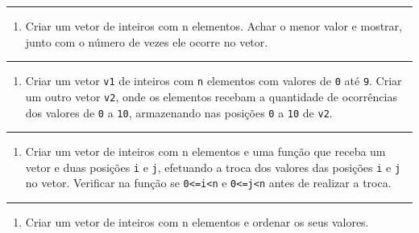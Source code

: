 \documentclass[12pt,a4paper]{article}
\renewcommand{\linethickness}{0.05em}
\providecommand{\tightlist}{%
      \setlength{\itemsep}{0pt}\setlength{\parskip}{0pt}}
\begin{document}
    \begin{center}\rule{0.5\linewidth}{\linethickness}\end{center}

\begin{enumerate}
\def\labelenumi{\arabic{enumi}.}
\setcounter{enumi}{1}
\tightlist
\item
  Criar um vetor de inteiros com n elementos. Achar o menor valor e
  mostrar, junto com o número de vezes ele ocorre no vetor.
\end{enumerate}

    \begin{center}\rule{0.5\linewidth}{\linethickness}\end{center}

\begin{enumerate}
\def\labelenumi{\arabic{enumi}.}
\setcounter{enumi}{2}
\tightlist
\item
  Criar um vetor \texttt{v1} de inteiros com \texttt{n} elementos com
  valores de \texttt{0} até \texttt{9}. Criar um outro vetor
  \texttt{v2}, onde os elementos recebam a quantidade de ocorrências dos
  valores de \texttt{0} a \texttt{10}, armazenando nas posições
  \texttt{0} a \texttt{10} de \texttt{v2}.
\end{enumerate}

    \begin{center}\rule{0.5\linewidth}{\linethickness}\end{center}

\begin{enumerate}
\def\labelenumi{\arabic{enumi}.}
\setcounter{enumi}{3}
\tightlist
\item
  Criar um vetor de inteiros com n elementos e uma função que receba um
  vetor e duas posições \texttt{i} e \texttt{j}, efetuando a troca dos
  valores das posições \texttt{i} e \texttt{j} no vetor. Verificar na
  função se \texttt{0\textless{}=i\textless{}n} e
  \texttt{0\textless{}=j\textless{}n} antes de realizar a troca.
\end{enumerate}

    \begin{center}\rule{0.5\linewidth}{\linethickness}\end{center}

\begin{enumerate}
\def\labelenumi{\arabic{enumi}.}
\setcounter{enumi}{4}
\tightlist
\item
  Criar um vetor de inteiros com n elementos e ordenar os seus valores.
\end{enumerate}
\end{document}
